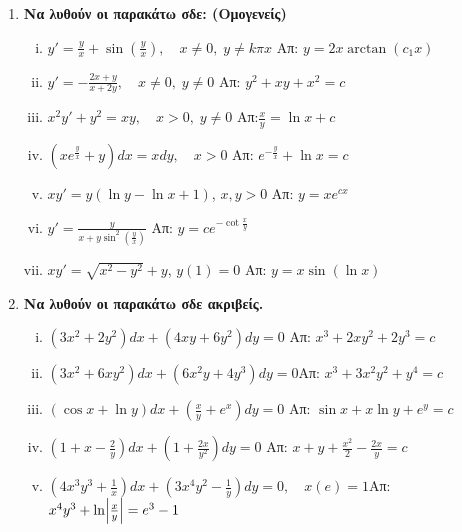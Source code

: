 \begin{enumerate}
  \item {\bfseries Να λυθούν οι παρακάτω σδε: (Ομογενείς)}
    \begin{enumerate}[i)]
      \item $y'=\frac{y}{x}+\sin(\frac{y}{x}), \quad x\neq 0,\; y\neq k\pi x$ 
        \hfill Απ: $y=2x\arctan(c_{1}x)$
      \item $y'=-\frac{2x+y}{x+2y}, \quad x\neq 0,\; y\neq 0$  
        \hfill Απ: $y^{2}+xy+x^{2}=c$
      \item $x^{2}y'+y^{2}=xy, \quad x>0,\; y\neq 0$ \hfill Απ:$\frac{x}{y}=\ln x+c$
      \item $\left(xe^{\frac{y}{x}}+y\right)dx=xdy, \quad x>0$ 
        \hfill Απ: $e^{-\frac{y}{x}}+\ln x =c$
      \item $ xy'=y(\ln{y} - \ln{x} +1) $, $ x,y>0 $ \hfill Απ: $ y=xe^{cx} $ 
      \item $ y' = \frac{y}{x+y \sin^{2}{(\frac{y}{x})}} $ 
        \hfill Απ: $ y=ce^{- \cot{\frac{x}{y} }} $  
      \item $ xy' = \sqrt{ x^{2}-y^{2} } +y $, \quad $ y(1)=0 $ 
        \hfill Απ: $ y = x \sin{(\ln{x})}$  
    \end{enumerate}

  \item {\bfseries Να λυθούν οι παρακάτω σδε ακριβείς.}
    \begin{enumerate}[i)]
      \item $ (3x^{2}+2y^{2})dx+(4xy+6y^{2})dy=0  $ 
        \hfill Απ: $ x^{3}+2xy^{2}+2y^{3}=c $ 
      \item $(3x^2+6xy^2)dx+(6x^2y+4y^3)dy=0$\hfill Απ: $x^3+3x^2y^2+y^4=c$
      \item $ (\cos{x} + \ln{y})dx + \left(\frac{x}{y} + e^{x}\right)dy=0 $ 
        \hfill Απ: $ \sin{x} + x \ln{y} + e^{y}=c $ 
      \item $\left(1+x-\frac{2}{y}\right)dx+\left(1+\frac{2x}{y^2}\right)dy=0$
        \hfill Απ: $x+y+\frac{x^2}{2}-\frac{2x}{y}=c$
      \item $\left(4x^3y^3+\frac{1}{x}\right)dx+\left(3x^4y^2-\frac{1}{y}\right)dy=0, 
        \quad x(e)=1$\hfill Απ: $x^4y^3+\ln \Bigl|\frac{x}{y}\Bigr|=e^3-1$
    \end{enumerate}


\end{enumerate}
